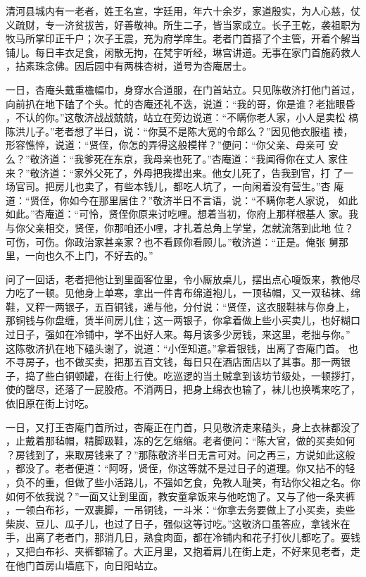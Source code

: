 清河县城内有一老者，姓王名宣，字廷用，年六十余岁，家道殷实，为人心慈，仗
义疏财，专一济贫拔苦，好善敬神。所生二子，皆当家成立。长子王乾，袭祖职为
牧马所掌印正千户；次子王震，充为府学庠生。老者门首搭了个主管，开着个解当
铺儿。每日丰衣足食，闲散无拘，在梵宇听经，琳宫讲道。无事在家门首施药救人
，拈素珠念佛。因后园中有两株杏树，道号为杏庵居士。

一日，杏庵头戴重檐幅巾，身穿水合道服，在门首站立。只见陈敬济打他门首过，
向前扒在地下磕了个头。忙的杏庵还礼不迭，说道：“我的哥，你是谁？老拙眼昏
，不认的你。”这敬济战战兢兢，站立在旁边说道：“不瞒你老人家，小人是卖松
槁陈洪儿子。”老者想了半日，说：“你莫不是陈大宽的令郎么？”因见他衣服褴
褛，形容憔悴，说道：“贤侄，你怎的弄得这般模样？”便问：“你父亲、母亲可
安么？”敬济道：“我爹死在东京，我母亲也死了。”杏庵道：“我闻得你在丈人
家住来？”敬济道：“家外父死了，外母把我撵出来。他女儿死了，告我到官，打
了一场官司。把房儿也卖了，有些本钱儿，都吃人坑了，一向闲着没有营生。”杏
庵道：“贤侄，你如今在那里居住？”敬济半日不言语，说：“不瞒你老人家说，
如此如此。”杏庵道：“可怜，贤侄你原来讨吃哩。想着当初，你府上那样根基人
家。我与你父亲相交，贤侄，你那咱还小哩，才扎着总角上学堂，怎就流落到此地
位？可伤，可伤。你政治家甚亲家？也不看顾你看顾儿。”敬济道：“正是。俺张
舅那里，一向也久不上门，不好去的。”

问了一回话，老者把他让到里面客位里，令小厮放桌儿，摆出点心嗄饭来，教他尽
力吃了一顿。见他身上单寒，拿出一件青布绵道袍儿，一顶毡帽，又一双毡袜、绵
鞋，又秤一两银子，五百铜钱，递与他，分付说：“贤侄，这衣服鞋袜与你身上，
那铜钱与你盘缠，赁半间房儿住；这一两银子，你拿着做上些小买卖儿，也好糊口
过日子，强如在冷铺中，学不出好人来。每月该多少房钱，来这里，老拙与你。”
这陈敬济扒在地下磕头谢了，说道：“小侄知道。”拿着银钱，出离了杏庵门首。
也不寻房子，也不做买卖，把那五百文钱，每日只在酒店面店以了其事。那一两银
子，捣了些白铜顿罐，在街上行使。吃巡逻的当土贼拿到该坊节级处，一顿拶打，
使的罄尽，还落了一屁股疮。不消两日，把身上绵衣也输了，袜儿也换嘴来吃了，
依旧原在街上讨吃。

一日，又打王杏庵门首所过，杏庵正在门首，只见敬济走来磕头，身上衣袜都没了
，止戴着那毡帽，精脚趿鞋，冻的乞乞缩缩。老者便问：“陈大官，做的买卖如何
？房钱到了，来取房钱来了？”那陈敬济半日无言可对。问之再三，方说如此这般
，都没了。老者便道：“阿呀，贤侄，你这等就不是过日子的道理。你又拈不的轻
，负不的重，但做了些小活路儿，不强如乞食，免教人耻笑，有玷你父祖之名。你
如何不依我说？”一面又让到里面，教安童拿饭来与他吃饱了。又与了他一条夹裤
，一领白布衫，一双裹脚，一吊铜钱，一斗米：“你拿去务要做上了小买卖，卖些
柴炭、豆儿、瓜子儿，也过了日子，强似这等讨吃。”这敬济口虽答应，拿钱米在
手，出离了老者门，那消几日，熟食肉面，都在冷铺内和花子打伙儿都吃了。耍钱
，又把白布衫、夹裤都输了。大正月里，又抱着肩儿在街上走，不好来见老者，走
在他门首房山墙底下，向日阳站立。

